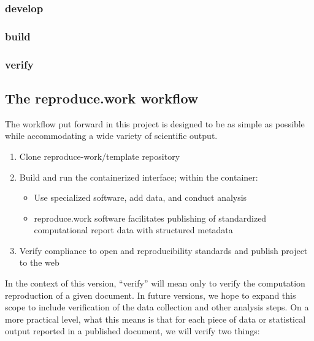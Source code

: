\hypertarget{develop}{%
\subsubsection{develop}\label{develop}}

\hypertarget{build}{%
\subsubsection{build}\label{build}}

\hypertarget{verify}{%
\subsubsection{verify}\label{verify}}

\hypertarget{the-reproduce.work-workflow}{%
\subsection{The reproduce.work workflow}\label{the-reproduce.work-workflow}}

The workflow put forward in this project is designed to be as simple as possible while accommodating a wide variety of scientific output. 

\begin{enumerate}
\itemsep -0.2em
\item Clone reproduce-work/template repository
\item Build and run the containerized interface; within the container:

\begin{itemize}
\itemsep -0.2em
\item Use specialized software, add data, and conduct analysis
\item reproduce.work software facilitates publishing of standardized computational report data with structured metadata
\end{itemize}
\item Verify compliance to open and reproducibility standards and publish project to the web
\end{enumerate}

In the context of this version, ``verify'' will mean only to verify the computation reproduction of a given document. In future versions, we hope to expand this scope to include verification of the data collection and other analysis steps. On a more practical level, what this means is that for each piece of data or statistical output reported in a published document, we will verify two things:

